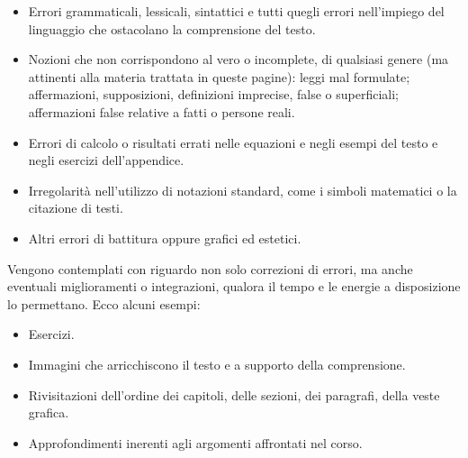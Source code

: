 \begin{itemize}
    \item Errori grammaticali, lessicali, sintattici e tutti quegli errori nell'impiego
    del linguaggio che ostacolano la comprensione del testo.

    \item Nozioni che non corrispondono al vero o incomplete, di qualsiasi genere (ma
    attinenti alla materia trattata in queste pagine):
    leggi mal formulate; affermazioni, supposizioni, definizioni imprecise, false o
    superficiali; affermazioni false relative a fatti o persone reali.

    \item Errori di calcolo o risultati errati nelle equazioni e negli esempi del testo e negli
    esercizi dell'appendice.

    \item Irregolarità nell'utilizzo di notazioni standard, come i simboli matematici
    o la citazione di testi.
    
    \item Altri errori di battitura oppure grafici ed estetici.
\end{itemize}

Vengono contemplati con riguardo
non solo correzioni di errori, ma anche eventuali miglioramenti o integrazioni,
qualora il tempo e le energie a disposizione lo permettano. Ecco alcuni esempi:

\begin{itemize}
    \item Esercizi.
    \item Immagini che arricchiscono il testo e a supporto della comprensione.
    \item Rivisitazioni dell'ordine dei capitoli, delle sezioni, dei paragrafi, della veste grafica.
    \item Approfondimenti inerenti agli argomenti affrontati nel corso.
\end{itemize}